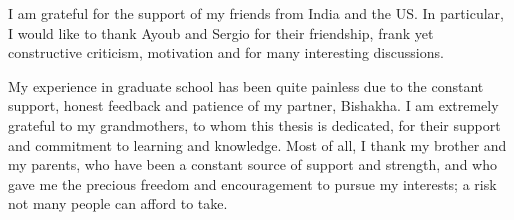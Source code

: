 I am grateful for the support of my friends from India and the US. In particular, I would like to thank Ayoub and Sergio for their friendship, frank yet constructive criticism, motivation and for many interesting discussions. 

My experience in graduate school has been quite painless due to the constant support, honest feedback and patience of my partner, Bishakha. I am extremely grateful to my grandmothers, to whom this thesis is dedicated, for their support and commitment to learning and knowledge. Most of all, I thank my brother and my parents, who have been a constant source of support and strength, and who gave me the precious freedom and encouragement to pursue my interests; a risk not many people can afford to take.